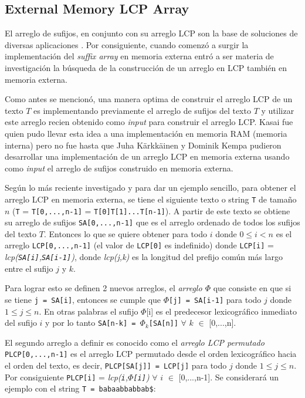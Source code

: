 \subsection{External Memory LCP Array}

El arreglo de sufijos, en conjunto con su arreglo LCP son la base de soluciones de diversas aplicaciones \cite{aplicacion}. Por consiguiente, cuando comenzó a surgir la implementación del \textit{suffix array} en memoria externa entró a ser materia de investigación la búsqueda de la construcción de un arreglo en LCP también en memoria externa.

Como antes se mencionó, una manera optima de construir el arreglo LCP de un texto $T$ es implementando previamente el arreglo de sufijos del texto $T$ y utilizar este arreglo recien obtenido como \textit{input} para construir el arreglo LCP. Kasai \cite{kasai} fue quien pudo llevar esta idea a una implementación en memoria RAM (memoria interna) pero no fue hasta que Juha Kärkkäinen y Dominik Kempa \cite{lcpscan} pudieron desarrollar una implementación de un arreglo LCP en memoria externa usando como \textit{input} el arreglo de sufijos construido en memoria externa.

Según lo más reciente investigado \cite{emsparse} y para dar un ejemplo sencillo, para obtener el arreglo LCP en memoria externa, se tiene el siguiente texto o string \texttt{T} de tamaño $n$ (\texttt{T} = \texttt{T[0,...,n-1]} = \texttt{T[0]T[1]...T[n-1]}). A partir de este texto se obtiene su arreglo de sufijos \texttt{SA[0,...,n-1]} que es el arreglo ordenado de todos los sufijos del texto $T$. Entonces lo que se quiere obtener para todo $i$ donde $0 \leq i < n$ es el arreglo \texttt{LCP[0,...,n-1]} (el valor de \texttt{LCP[0]} es indefinido) donde \texttt{LCP[i]} = \textit{lcp(\texttt{SA[i]},\texttt{SA[i-1]})}, donde \textit{lcp(j,k)} es la longitud del prefijo común más largo entre el sufijo $j$ y $k$.

Para lograr esto se definen 2 nuevos arreglos, el \textit{arreglo $\Phi$} que consiste en que si se tiene \texttt{j = SA[i]}, entonces se cumple que \texttt{$\Phi$[j] = SA[i-1]} para todo $j$ donde $1 \leq j \leq n$. En otras palabras el sufijo $\Phi$[i] es el predecesor lexicográfico inmediato del sufijo $i$ y por lo tanto \texttt{SA[n-k] = $\Phi_{k}$[SA[n]]} $\forall$ $k$ $\in$ [0,...,n].

El segundo arreglo a definir es conocido como el \textit{arreglo LCP permutado} \texttt{PLCP[0,...,n-1]} es el arreglo LCP permutado desde el orden lexicográfico hacia el orden del texto, es decir, \texttt{PLCP[SA[j]] = LCP[j]} para todo $j$ donde $1 \leq j \leq n$. Por consiguiente \texttt{PLCP[i]} = \textit{lcp(\texttt{i},\texttt{$\Phi$[i]})} $\forall$ $i$ $\in$ [0,...,n-1]. Se considerará un ejemplo con el string \texttt{T = babaabbabbab\$}:

